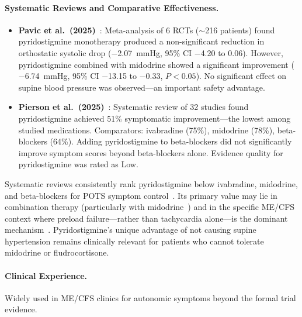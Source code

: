 \paragraph{Systematic Reviews and Comparative Effectiveness.}
\begin{itemize}
    \item \textbf{Pavic et al.\ (2025)}~\cite{Pavic2025pyridostigmine}: Meta-analysis of 6 RCTs ($\sim$216 patients) found pyridostigmine monotherapy produced a non-significant reduction in orthostatic systolic drop ($-$2.07~mmHg, 95\% CI $-$4.20 to 0.06). However, pyridostigmine combined with midodrine showed a significant improvement ($-$6.74~mmHg, 95\% CI $-$13.15 to $-$0.33, $P<0.05$). No significant effect on supine blood pressure was observed---an important safety advantage.

    \item \textbf{Pierson et al.\ (2025)}~\cite{POTSoralreview2025}: Systematic review of 32 studies found pyridostigmine achieved 51\% symptomatic improvement---the lowest among studied medications. Comparators: ivabradine (75\%), midodrine (78\%), beta-blockers (64\%). Adding pyridostigmine to beta-blockers did not significantly improve symptom scores beyond beta-blockers alone. Evidence quality for pyridostigmine was rated as Low.
\end{itemize}

\begin{limitation}
Systematic reviews consistently rank pyridostigmine below ivabradine, midodrine, and beta-blockers for POTS symptom control~\cite{POTSoralreview2025}. Its primary value may lie in combination therapy (particularly with midodrine~\cite{Pavic2025pyridostigmine}) and in the specific ME/CFS context where preload failure---rather than tachycardia alone---is the dominant mechanism~\cite{Joseph2022pyridostigmine}. Pyridostigmine's unique advantage of not causing supine hypertension remains clinically relevant for patients who cannot tolerate midodrine or fludrocortisone.
\end{limitation}

\paragraph{Clinical Experience.} Widely used in ME/CFS clinics for autonomic symptoms beyond the formal trial evidence.

